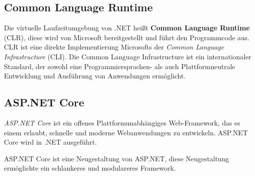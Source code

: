 \subsection{Common Language Runtime}
Die virtuelle Laufzeitumgebung von .NET heißt \textbf{Common Language Runtime} (CLR), diese wird von 
Microsoft bereitgestellt und führt den Programmcode aus.
CLR ist eine direkte Implementierung Microsofts der \textit{Common Language Infrastructure} (CLI).
Die Common Language Infrastructure ist ein internationaler Standard, der sowohl eine 
Programmiersprachen- als auch Plattformneutrale Entwicklung und Ausführung von Anwendungen ermöglicht.  

\subsection{ASP.NET Core}
\textit{ASP.NET Core} ist ein offenes Plattformunabhängiges Web-Framework, das es einem erlaubt,
schnelle und moderne Webanwendungen zu entwickeln. ASP.NET Core wird in .NET ausgeführt.

ASP.NET Core ist eine Neugestaltung von ASP.NET, diese Neugestaltung ermöglichte ein 
schlankeres und modulareres Framework. 